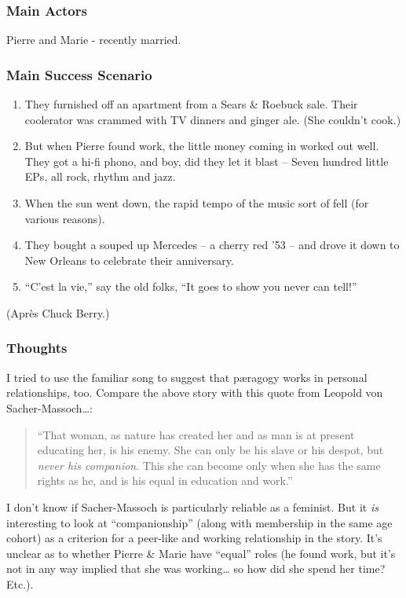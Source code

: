 \subsubsection{Main Actors}

Pierre and Marie - recently married.

\subsubsection{Main Success Scenario}

\begin{enumerate}
\item
  They furnished off an apartment from a Sears \& Roebuck sale. Their
  coolerator was crammed with TV dinners and ginger ale. (She couldn't
  cook.)
\item
  But when Pierre found work, the little money coming in worked out
  well. They got a hi-fi phono, and boy, did they let it blast -- Seven
  hundred little EPs, all rock, rhythm and jazz.
\item
  When the sun went down, the rapid tempo of the music sort of fell (for
  various reasons).
\item
  They bought a souped up Mercedes -- a cherry red '53 -- and drove it
  down to New Orleans to celebrate their anniversary.
\item
  ``C'est la vie,'' say the old folks, ``It goes to show you never can
  tell!''
\end{enumerate}
(Après Chuck Berry.)

\subsubsection{Thoughts}

I tried to use the familiar song to suggest that pæragogy works in
personal relationships, too. Compare the above story with this quote
from Leopold von Sacher-Massoch\ldots{}:

\begin{quote}
``That woman, as nature has created her and as man is at present
educating her, is his enemy. She can only be his slave or his despot,
but \emph{never his companion}. This she can become only when she has
the same rights as he, and is his equal in education and work.''

\end{quote}
I don't know if Sacher-Massoch is particularly reliable as a feminist.
But it \emph{is} interesting to look at ``companionship'' (along with
membership in the same age cohort) as a criterion for a peer-like and
working relationship in the story. It's unclear as to whether Pierre \&
Marie have ``equal'' roles (he found work, but it's not in any way
implied that she was working\ldots{} so how did she spend her time?
Etc.).
